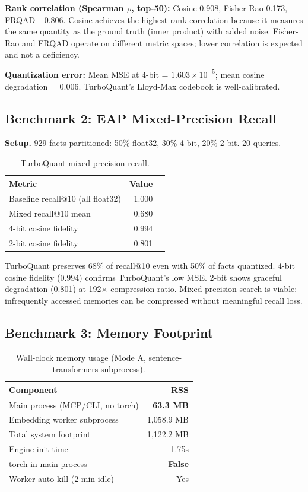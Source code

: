 \textbf{Rank correlation (Spearman $\rho$, top-50):} Cosine 0.908, Fisher-Rao 0.173, FRQAD $-$0.806. Cosine achieves the highest rank correlation because it measures the same quantity as the ground truth (inner product) with added noise. Fisher-Rao and FRQAD operate on different metric spaces; lower correlation is expected and not a deficiency.

\textbf{Quantization error:} Mean MSE at 4-bit = $1.603 \times 10^{-5}$; mean cosine degradation = 0.006. TurboQuant's Lloyd-Max codebook is well-calibrated.

\subsection{Benchmark 2: EAP Mixed-Precision Recall}

\textbf{Setup.} 929 facts partitioned: 50\% float32, 30\% 4-bit, 20\% 2-bit. 20 queries.

\begin{table}[h]
\centering
\caption{TurboQuant mixed-precision recall.}
\small
\begin{tabular}{lrr}
\toprule
\textbf{Metric} & \textbf{Value} \\
\midrule
Baseline recall@10 (all float32) & 1.000 \\
Mixed recall@10 mean & 0.680 \\
4-bit cosine fidelity & 0.994 \\
2-bit cosine fidelity & 0.801 \\
\bottomrule
\end{tabular}
\end{table}

TurboQuant preserves 68\% of recall@10 even with 50\% of facts quantized. 4-bit cosine fidelity (0.994) confirms TurboQuant's low MSE. 2-bit shows graceful degradation (0.801) at 192$\times$ compression ratio. Mixed-precision search is viable: infrequently accessed memories can be compressed without meaningful recall loss.

\subsection{Benchmark 3: Memory Footprint}

\begin{table}[h]
\centering
\caption{Wall-clock memory usage (Mode A, sentence-transformers subprocess).}
\small
\begin{tabular}{lr}
\toprule
\textbf{Component} & \textbf{RSS} \\
\midrule
Main process (MCP/CLI, no torch) & \textbf{63.3 MB} \\
Embedding worker subprocess & 1,058.9 MB \\
Total system footprint & 1,122.2 MB \\
\midrule
Engine init time & 1.75s \\
torch in main process & \textbf{False} \\
Worker auto-kill (2 min idle) & Yes \\
\bottomrule
\end{tabular}
\end{table}

